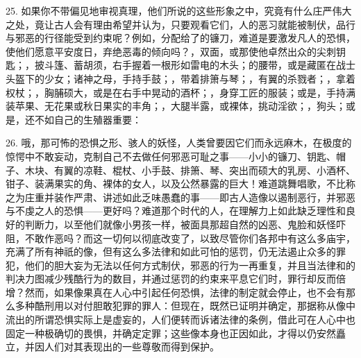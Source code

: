 25. 如果你不带偏见地审视真理，他们所说的这些形象之中，究竟有什么庄严伟大之处，竟让古人会有理由希望并认为，只要观看它们，人的恶习就能被制伏，品行与邪恶的行径能受到约束呢？例如，分配给了的镰刀，难道是要激发凡人的恐惧，使他们愿意平安度日，弃绝恶毒的倾向吗？，双面，或那使他卓然出众的尖刺钥匙；，披斗篷、蓄胡须，右手握着一根形如雷电的木头；的腰带，或是藏匿在战士头盔下的少女；诸神之母，手持手鼓；，带着排箫与琴；，有翼的杀戮者；，拿着权杖；，胸脯硕大，或是在右手中晃动的酒杯；，身穿工匠的服装；或是，手持满装苹果、无花果或秋日果实的丰角；，大腿半露，或裸体，挑动淫欲；，狗头；或是，还不如自己的生殖器重要：\par

26. 哦，那可怖的恐惧之形、骇人的妖怪，人类曾要因它们而永远麻木，在极度的惊愕中不敢妄动，克制自己不去做任何邪恶可耻之事——小小的镰刀、钥匙、帽子、木块、有翼的凉鞋、棍杖、小手鼓、排箫、琴、突出而硕大的乳房、小酒杯、钳子、装满果实的角、裸体的女人，以及公然暴露的巨大！难道跳舞唱歌，不比称之为庄重并装作严肃、讲述如此乏味愚蠢的事——即古人造像以遏制恶行，并邪恶与不虔之人的恐惧——更好吗？难道那个时代的人，在理解力上如此缺乏理性和良好的判断力，以至他们就像小男孩一样，被面具那超自然的凶恶、鬼脸和妖怪吓阻，不敢作恶吗？而这一切何以彻底改变了，以致尽管你们各邦中有这么多庙宇，充满了所有神祇的像，但有这么多法律和如此可怕的惩罚，仍无法遏止众多的罪犯，他们的胆大妄为无法以任何方式制伏，邪恶的行为一再重复，并且当法律和的判决力图减少残酷行为的数目，并通过惩罚的约束来平息它们时，罪行却反而倍增？然而，如果像果真在人心中引起任何恐惧，法律的制定就会停止，也不会有那么多种酷刑用以对付胆敢犯罪的罪人：但现在，既然已证明并确定，那据称从像中流出的所谓恐惧实际上是虚妄的，人们便转而诉诸法律的条例，借此可在人心中也固定一种极确切的畏惧，并确定定罪；这些像本身也正因如此，才得以仍安然矗立，并因人们对其表现出的一些尊敬而得到保护。\par



